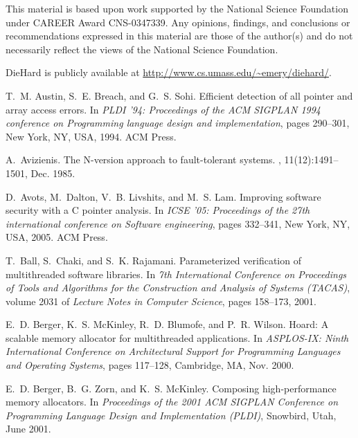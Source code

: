 \documentclass{sig-alternate}
\begin{document}
This material is based upon work supported by the National Science
Foundation under CAREER Award CNS-0347339. Any opinions, findings, and
conclusions or recommendations expressed in this material are those of
the author(s) and do not necessarily reflect the views of the National
Science Foundation.

DieHard is publicly available at
\url{http://www.cs.umass.edu/~emery/diehard/}.

\begin{thebibliography}{10}

T.~M. Austin, S.~E. Breach, and G.~S. Sohi.
\newblock Efficient detection of all pointer and array access errors.
\newblock In {\em PLDI '94: Proceedings of the ACM SIGPLAN 1994 conference on
  Programming language design and implementation}, pages 290--301, New York,
  NY, USA, 1994. ACM Press.

A.~Avizienis.
\newblock The {N}-version approach to fault-tolerant systems.
, 11(12):1491--1501,
  Dec. 1985.

D.~Avots, M.~Dalton, V.~B. Livshits, and M.~S. Lam.
\newblock Improving software security with a {C} pointer analysis.
\newblock In {\em ICSE '05: Proceedings of the 27th international conference on
  Software engineering}, pages 332--341, New York, NY, USA, 2005. ACM Press.

T.~Ball, S.~Chaki, and S.~K. Rajamani.
\newblock Parameterized verification of multithreaded software libraries.
\newblock In {\em 7th International Conference on Proceedings of Tools and
  Algorithms for the Construction and Analysis of Systems (TACAS)}, volume 2031
  of {\em Lecture Notes in Computer Science}, pages 158--173, 2001.

E.~D. Berger, K.~S. McKinley, R.~D. Blumofe, and P.~R. Wilson.
\newblock Hoard: A scalable memory allocator for multithreaded applications.
\newblock In {\em {ASPLOS-IX}: Ninth International Conference on Architectural
  Support for Programming Languages and Operating Systems}, pages 117--128,
  Cambridge, MA, Nov. 2000.

E.~D. Berger, B.~G. Zorn, and K.~S. McKinley.
\newblock Composing high-performance memory allocators.
\newblock In {\em Proceedings of the 2001 ACM SIGPLAN Conference on Programming
  Language Design and Implementation (PLDI)}, Snowbird, Utah, June 2001.


\end{thebibliography}
\end{document}

